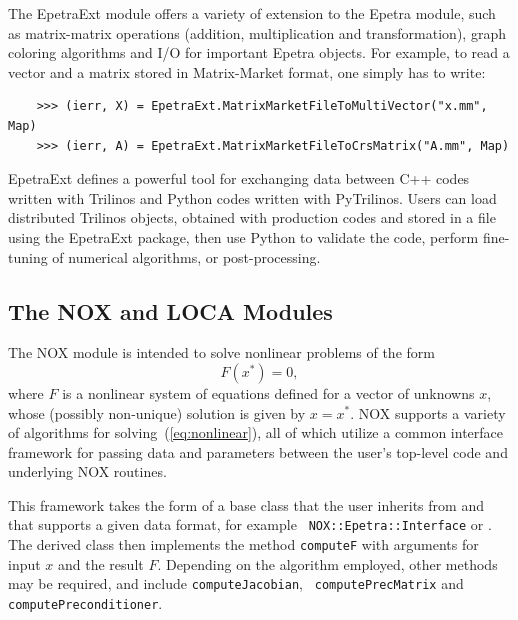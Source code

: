 \documentclass[acmtocl]{acmtrans2m}
\newcommand{\PyTrilinos}{{PyTrilinos}}
\begin{document}
The EpetraExt module offers a variety of extension to the Epetra
module, such as matrix-matrix operations (addition, multiplication and
transformation), graph coloring algorithms and I/O for important
Epetra objects.  For example, to read a vector and a matrix stored in
Matrix-Market format, one simply has to write:
\begin{verbatim}
    >>> (ierr, X) = EpetraExt.MatrixMarketFileToMultiVector("x.mm", Map)
    >>> (ierr, A) = EpetraExt.MatrixMarketFileToCrsMatrix("A.mm", Map)
\end{verbatim}
EpetraExt defines a powerful tool for exchanging data between C++
codes written with Trilinos and Python codes written with \PyTrilinos.
Users can load distributed Trilinos objects, obtained with production
codes and stored in a file using the EpetraExt package, then use
Python to validate the code, perform fine-tuning of numerical
algorithms, or post-processing.

\subsection{The NOX and LOCA Modules}
\label{subsec:nox}

The NOX module is intended to solve nonlinear problems of the form
\begin{equation}
  \label{eq:nonlinear}
  F(x^*) = 0,
\end{equation}
where $F$ is a nonlinear system of equations defined for a vector of
unknowns $x$, whose (possibly non-unique) solution is given by
$x=x^*$.  NOX supports a variety of algorithms for
solving~(\ref{eq:nonlinear}), all of which utilize a common interface
framework for passing data and parameters between the user's top-level
code and underlying NOX routines.

This framework takes the form of a base class that the user inherits
from and that supports a given data format, for example {\tt
  NOX::Epetra::Interface} or .  The derived
class then implements the method {\tt computeF} with arguments for
input $x$ and the result $F$.  Depending on the algorithm employed,
other methods may be required, and include {\tt computeJacobian}, {\tt
  computePrecMatrix} and {\tt computePreconditioner}.
\end{document}
